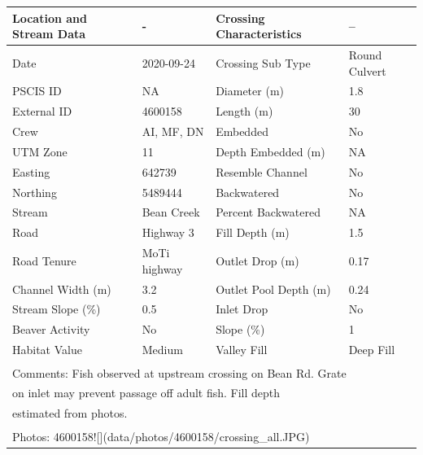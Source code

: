 \documentclass[
]{book}
\begin{document}
\begin{tabular}{llll}
\toprule
Location and Stream Data & - & Crossing Characteristics & --\\
\midrule
Date & 2020-09-24 & Crossing Sub Type & Round Culvert\\
PSCIS ID & NA & Diameter (m) & 1.8\\
External ID & 4600158 & Length (m) & 30\\
Crew & AI, MF, DN & Embedded & No\\
UTM Zone & 11 & Depth Embedded (m) & NA\\
\addlinespace
Easting & 642739 & Resemble Channel & No\\
Northing & 5489444 & Backwatered & No\\
Stream & Bean Creek & Percent Backwatered & NA\\
Road & Highway 3 & Fill Depth (m) & 1.5\\
Road Tenure & MoTi highway & Outlet Drop (m) & 0.17\\
\addlinespace
Channel Width (m) & 3.2 & Outlet Pool Depth (m) & 0.24\\
Stream Slope (\%) & 0.5 & Inlet Drop & No\\
Beaver Activity & No & Slope (\%) & 1\\
Habitat Value & Medium & Valley Fill & Deep Fill\\
\bottomrule
\multicolumn{4}{l}{\textsuperscript{} Comments: Fish observed at upstream crossing on Bean Rd.  Grate}\\
\multicolumn{4}{l}{on inlet may prevent passage off adult fish.  Fill depth}\\
\multicolumn{4}{l}{estimated from photos.}\\
\multicolumn{4}{l}{\textsuperscript{} Photos: 4600158![](data/photos/4600158/crossing\_all.JPG)}\\
\end{tabular}
\end{document}
